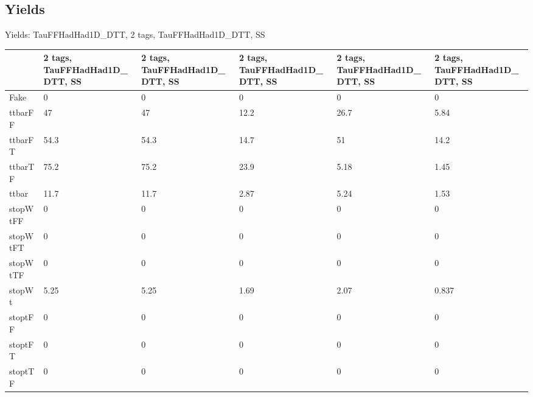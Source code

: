 
\subsection{Yields}

\begin{frame}{Yields: TauFFHadHad1D\_DTT, 2 tags, TauFFHadHad1D\_DTT, SS}
\begin{center}
  \begin{tabular}{l| >{\centering\let\newline\\\arraybackslash\hspace{0pt}}m{1.4cm}| >{\centering\let\newline\\\arraybackslash\hspace{0pt}}m{1.4cm}| >{\centering\let\newline\\\arraybackslash\hspace{0pt}}m{1.4cm}| >{\centering\let\newline\\\arraybackslash\hspace{0pt}}m{1.4cm}| >{\centering\let\newline\\\arraybackslash\hspace{0pt}}m{1.4cm}}
    & 2 tags, TauFFHadHad1D\_DTT, SS & 2 tags, TauFFHadHad1D\_DTT, SS & 2 tags, TauFFHadHad1D\_DTT, SS & 2 tags, TauFFHadHad1D\_DTT, SS & 2 tags, TauFFHadHad1D\_DTT, SS \\
 \hline \hline
    Fake& 0 & 0 & 0 & 0 & 0 \\
 \hline
    ttbarFF& 47 & 47 & 12.2 & 26.7 & 5.84 \\
 \hline
    ttbarFT& 54.3 & 54.3 & 14.7 & 51 & 14.2 \\
 \hline
    ttbarTF& 75.2 & 75.2 & 23.9 & 5.18 & 1.45 \\
 \hline
    ttbar& 11.7 & 11.7 & 2.87 & 5.24 & 1.53 \\
 \hline
    stopWtFF& 0 & 0 & 0 & 0 & 0 \\
 \hline
    stopWtFT& 0 & 0 & 0 & 0 & 0 \\
 \hline
    stopWtTF& 0 & 0 & 0 & 0 & 0 \\
 \hline
    stopWt& 5.25 & 5.25 & 1.69 & 2.07 & 0.837 \\
 \hline
    stoptFF& 0 & 0 & 0 & 0 & 0 \\
 \hline
    stoptFT& 0 & 0 & 0 & 0 & 0 \\
 \hline
    stoptTF& 0 & 0 & 0 & 0 & 0 \\

\end{tabular}
\end{center}
\end{frame}
